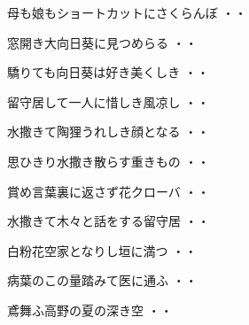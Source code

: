 \vspace{0.6cm}
\begin{shiika}母も娘もショートカットにさくらんぼ
\hfill{・・}\end{shiika}
\vspace{0.6cm}
\begin{shiika}窓開き大向日葵に見つめらる
\hfill{・・}\end{shiika}
\vspace{0.6cm}
\begin{shiika}驕りても向日葵は好き美くしき
\hfill{・・}\end{shiika}
\vspace{0.6cm}
\begin{shiika}留守居して一人に惜しき風凉し
\hfill{・・}\end{shiika}
\vspace{0.6cm}
\begin{shiika}水撒きて陶狸うれしき顔となる
\hfill{・・}\end{shiika}
\vspace{0.6cm}
\begin{shiika}思ひきり水撒き散らす重きもの
\hfill{・・}\end{shiika}
\vspace{0.6cm}
\begin{shiika}賞め言葉裏に返さず花クローバ
\hfill{・・}\end{shiika}
\vspace{0.6cm}
\begin{shiika}水撒きて木々と話をする留守居
\hfill{・・}\end{shiika}
\vspace{0.6cm}
\begin{shiika}白粉花空家となりし垣に満つ
\hfill{・・}\end{shiika}
\vspace{0.6cm}
\begin{shiika}病葉のこの量踏みて医に通ふ
\hfill{・・}\end{shiika}
\vspace{0.6cm}
\begin{shiika}鳶舞ふ高野の夏の深き空
\hfill{・・}\end{shiika}
